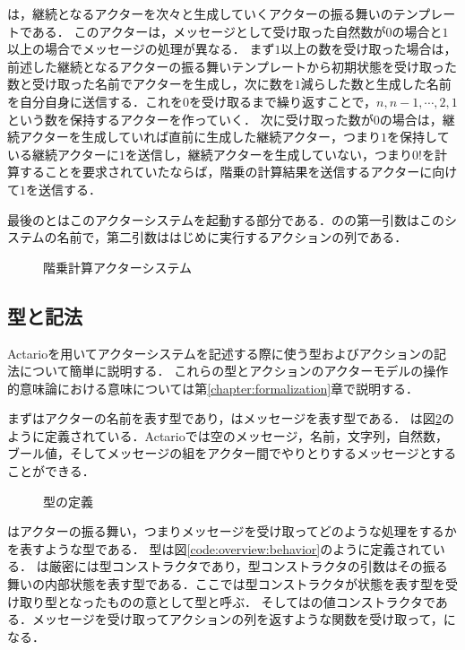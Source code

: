 は，継続となるアクターを次々と生成していくアクターの振る舞いのテンプレートである．
このアクターは，メッセージとして受け取った自然数が$0$の場合と$1$以上の場合でメッセージの処理が異なる．
まず$1$以上の数を受け取った場合は，前述した継続となるアクターの振る舞いテンプレートから初期状態を受け取った数と受け取った名前でアクターを生成し，次に数を$1$減らした数と生成した名前を自分自身に送信する．これを$0$を受け取るまで繰り返すことで，$n, n - 1, \cdots, 2, 1$ という数を保持するアクターを作っていく．
次に受け取った数が$0$の場合は，継続アクターを生成していれば直前に生成した継続アクター，つまり$1$を保持している継続アクターに$1$を送信し，継続アクターを生成していない，つまり$0!$を計算することを要求されていたならば，階乗の計算結果を送信するアクターに向けて$1$を送信する．

最後のとはこのアクターシステムを起動する部分である．のの第一引数はこのシステムの名前で，第二引数ははじめに実行するアクションの列である．

\begin{figure}[tp]
  
  \caption{階乗計算アクターシステム}\label{code:overview:fact-impl}
\end{figure}

\subsection{型と記法}

Actarioを用いてアクターシステムを記述する際に使う型およびアクションの記法について簡単に説明する．
これらの型とアクションのアクターモデルの操作的意味論における意味については第\ref{chapter:formalization}章で説明する．

まずはアクターの名前を表す型であり，はメッセージを表す型である．
は図\ref{code:overview:message}のように定義されている．Actarioでは空のメッセージ，名前，文字列，自然数，ブール値，そしてメッセージの組をアクター間でやりとりするメッセージとすることができる．

\begin{figure}
  
  \caption{型の定義}\label{code:overview:message}
\end{figure}

はアクターの振る舞い，つまりメッセージを受け取ってどのような処理をするかを表すような型である．
型は図\ref{code:overview:behavior}のように定義されている．
は厳密には型コンストラクタであり，型コンストラクタの引数はその振る舞いの内部状態を表す型である．ここでは型コンストラクタが状態を表す型を受け取り型となったものの意として型と呼ぶ．
そしてはの値コンストラクタである．メッセージを受け取ってアクションの列を返すような関数を受け取って，になる．

